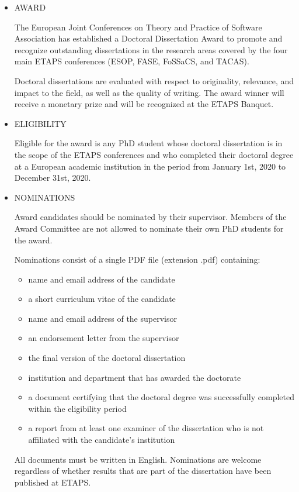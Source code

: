\documentclass{article}
\begin{document}
\begin{itemize}\item  AWARD 
 
  The European Joint Conferences on Theory and Practice of Software Association has established a Doctoral Dissertation Award to promote and recognize outstanding dissertations in the research areas covered by the four main ETAPS conferences (ESOP, FASE, FoSSaCS, and TACAS). 
 
  Doctoral dissertations are evaluated with respect to originality, relevance, and impact to the field, as well as the quality of writing. The award winner will receive a monetary prize and will be recognized at the ETAPS Banquet. 
 
\item  ELIGIBILITY 
 
  Eligible for the award is any PhD student whose doctoral dissertation is in the scope of the ETAPS conferences and who completed their doctoral degree at a European academic institution in the period from January 1st, 2020 to December 31st, 2020.  
 
\item  NOMINATIONS 
 
  Award candidates should be nominated by their supervisor. Members of the Award Committee are not allowed to nominate their own PhD students for the award. 
 
  Nominations consist of a single PDF file (extension .pdf) containing: 
 
\begin{itemize}\item  name and email address of the candidate
\item  a short curriculum vitae of the candidate
\item  name and email address of the supervisor
\item  an endorsement letter from the supervisor
\item  the final version of the doctoral dissertation
\item  institution and department that has awarded the doctorate
\item  a document certifying that the doctoral degree was successfully completed within the eligibility period 
\item  a report from at least one examiner of the dissertation who is not affiliated with the candidate's institution
\end{itemize} 
  All documents must be written in English. Nominations are welcome regardless of whether results that are part of the dissertation have been published at ETAPS. 
 

\end{itemize}
\end{document}
